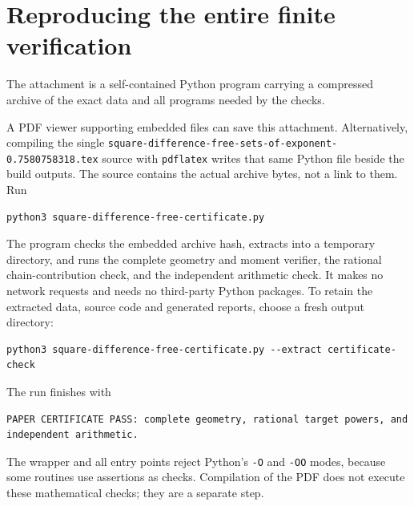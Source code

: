 \documentclass[11pt]{article}
\theoremstyle{definition}
\theoremstyle{remark}
\begin{document}
\section{Reproducing the entire finite verification}\label{app:reproduction}
The attachment is a self-contained Python program carrying a compressed
archive of the exact data and all programs needed by the checks.
\begin{center}
\end{center}
A PDF viewer supporting embedded files can save this attachment.
Alternatively, compiling the single \texttt{square-difference-free-sets-of-exponent-0.7580758318.tex}
source with \texttt{pdflatex} writes that same Python file beside the build
outputs. The source contains the actual archive bytes, not a link to them.
Run
\begin{lstlisting}
python3 square-difference-free-certificate.py
\end{lstlisting}
The program checks the embedded archive hash, extracts into a temporary
directory, and runs the complete geometry and moment verifier, the rational
chain-contribution check, and the independent arithmetic check. It makes no
network requests and needs no third-party Python packages. To retain the
extracted data, source code and generated reports, choose a fresh output
directory:
\begin{lstlisting}
python3 square-difference-free-certificate.py --extract certificate-check
\end{lstlisting}
The run finishes with
\begin{lstlisting}
PAPER CERTIFICATE PASS: complete geometry, rational target powers, and independent arithmetic.
\end{lstlisting}
The wrapper and all entry points reject Python's \texttt{-O} and \texttt{-OO}
modes, because some routines use assertions as checks. Compilation of the PDF
does not execute these mathematical checks; they are a separate step.
\end{document}
